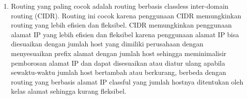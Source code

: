 \begin{enumerate}
	\item Routing yang paling cocok adalah routing berbasis classless inter-domain routing (CIDR). Routing ini cocok karena penggunaan CIDR memungkinkan routing yang lebih efisien dan fleksibel. CIDR memungkinkan penggunaan alamat IP yang lebih efisien dan fleksibel karena penggunaan alamat IP bisa diesuaikan dengan jumlah host yang dimiliki perusahaan dengan menyesuaikan prefix alamat dengan jumlah host sehingga meminimalisir pemborosan alamat IP dan dapat disesuaikan atau diatur ulang apabila sewaktu-waktu jumlah host bertambah atau berkurang, berbeda dengan routing yang berbasis alamat IP classful yang jumlah hostnya ditentukan oleh kelas alamat sehingga kurang fleksibel.
\end{enumerate}